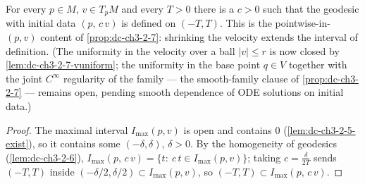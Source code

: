 \begin{lemma}
  \label{lem:dc-ch3-2-7-pointwise}
  \leanok
  For every $p\in M$, $v\in T_pM$ and every $T>0$ there is a $c>0$ such that
  the geodesic with initial data $(p,\,c\,v)$ is defined on $(-T,T)$. This is
  the pointwise-in-$(p,v)$ content of \cref{prop:dc-ch3-2-7}: shrinking the
  velocity extends the interval of definition. (The uniformity in the velocity
  over a ball $|v|\le r$ is now closed by \cref{lem:dc-ch3-2-7-vuniform}; the
  uniformity in the base point $q \in V$ together with the joint $C^\infty$
  regularity of the family — the smooth-family clause of
  \cref{prop:dc-ch3-2-7} — remains open, pending smooth dependence of ODE
  solutions on initial data.)
\end{lemma}
\begin{proof}
  \sketch
  \leanok
  The maximal interval $I_{\max}(p,v)$ is open and contains $0$
  (\cref{lem:dc-ch3-2-5-exist}), so it contains some $(-\delta,\delta)$,
  $\delta>0$. By the homogeneity of geodesics (\cref{lem:dc-ch3-2-6}),
  $I_{\max}(p,\,c\,v)=\{t:\ c\,t\in I_{\max}(p,v)\}$; taking
  $c=\frac{\delta}{2T}$ sends $(-T,T)$ inside $(-\delta/2,\delta/2)\subset
  I_{\max}(p,v)$, so $(-T,T)\subset I_{\max}(p,\,c\,v)$.
\end{proof}

